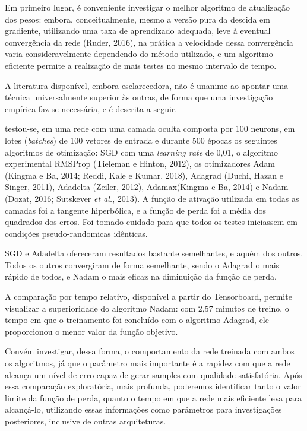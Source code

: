 \documentclass[]{article}
\begin{document}
Em primeiro lugar, é conveniente investigar o melhor algoritmo de
atualização dos pesos: embora, conceitualmente, mesmo a versão pura da
descida em gradiente, utilizando uma taxa de aprendizado adequada, leve
à eventual convergência da rede (Ruder, 2016), na prática a velocidade
dessa convergência varia consideravelmente dependendo do método
utilizado, e um algoritmo eficiente permite a realização de mais testes
no mesmo intervalo de tempo.

A literatura disponível, embora esclarecedora, não é unanime ao apontar
uma técnica universalmente superior às outras, de forma que uma
investigação empírica faz-se necessária, e é descrita a seguir.

testou-se, em uma rede com uma camada oculta composta por 100 neurons,
em lotes (\emph{batches}) de 100 vetores de entrada e durante 500 épocas
os seguintes algoritmos de otimização: SGD com uma \emph{learning rate}
de 0,01, o algoritmo experimental RMSProp (Tieleman e Hinton, 2012), os
otimizadores Adam (Kingma e Ba, 2014; Reddi, Kale e Kumar, 2018),
Adagrad (Duchi, Hazan e Singer, 2011), Adadelta (Zeiler, 2012),
Adamax(Kingma e Ba, 2014) e Nadam (Dozat, 2016; Sutskever \emph{et al.},
2013). A função de ativação utilizada em todas as camadas foi a tangente
hiperbólica, e a função de perda foi a média dos quadrados dos erros.
Foi tomado cuidado para que todos os testes iniciassem em condições
pseudo-randomicas idênticas.

SGD e Adadelta ofereceram resultados bastante semelhantes, e aquém dos
outros. Todos os outros convergiram de forma semelhante, sendo o Adagrad
o mais rápido de todos, e Nadam o mais eficaz na diminuição da função de
perda.

A comparação por tempo relativo, disponível a partir do Tensorboard,
permite visualizar a superioridade do algoritmo Nadam: com 2,57 minutos
de treino, o tempo em que o treinamento foi concluído com o algoritmo
Adagrad, ele proporcionou o menor valor da função objetivo.

Convém investigar, dessa forma, o comportamento da rede treinada com
ambos os algoritmos, já que o parâmetro mais importante é a rapidez com
que a rede alcança um nível de erro capaz de gerar samples com qualidade
satisfatória. Após essa comparação exploratória, mais profunda,
poderemos identificar tanto o valor limite da função de perda, quanto o
tempo em que a rede mais eficiente leva para alcançá-lo, utilizando
essas informações como parâmetros para investigações posteriores,
inclusive de outras arquiteturas.
\end{document}
